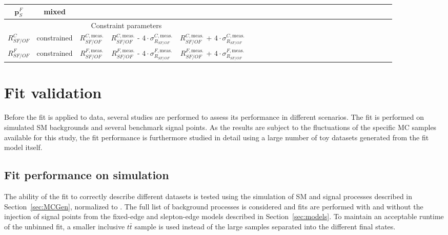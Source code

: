 \begin{table}[htbp]
\begin{center}
\begin{tabular}{c|c|c|c|ccccccccccccccccccccc}
$\mathbf{p}_{S}^{F}$ & mixed & \multicolumn{3}{c}{}\\ \hline
\multicolumn{5}{c}{Constraint parameters}\\ \hline
$R_{SF/OF}^{C}$ & constrained & $R_{SF/OF}^{C,\text{meas.}}$  & $R_{SF/OF}^{C,\text{meas.}}$ - $4\cdot \sigma_{R_{SF/OF}}^{C,\text{meas.}}$ & $R_{SF/OF}^{C,\text{meas.}}$ + $4\cdot \sigma_{R_{SF/OF}}^{C,\text{meas.}}$ \\
$R_{SF/OF}^{F}$ & constrained & $R_{SF/OF}^{F,\text{meas.}}$  & $R_{SF/OF}^{F,\text{meas.}}$ - $4\cdot \sigma_{R_{SF/OF}}^{F,\text{meas.}}$ & $R_{SF/OF}^{F,\text{meas.}}$ + $4\cdot \sigma_{R_{SF/OF}}^{F,\text{meas.}}$ \\
\end{tabular}

\end{center}
\end{table}


\section{Fit validation}
Before the fit is applied to data, several studies are performed to assess its performance in different scenarios. The fit is performed on simulated SM backgrounds and several benchmark signal points. As the results are subject to the fluctuations of the specific MC samples available for this study, the fit performance is furthermore studied in detail using a large number of toy datasets generated from the fit model itself. 
\subsection{Fit performance on simulation}
The ability of the fit to correctly describe different datasets is tested using the simulation of SM and signal processes described in Section~\ref{sec:MCGen}, normalized to \lumi. The full list of background processes is considered and fits are performed with and without the injection of signal points from the fixed-edge and slepton-edge models described in Section~\ref{sec:models}. To maintain an acceptable runtime of the unbinned fit, a smaller inclusive $t\bar{t}$ sample is used instead of the large samples separated into the different final states. 

